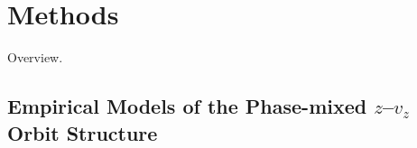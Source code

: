 


\section{Methods} \label{sec:methods}

Overview.

\subsection{Empirical Models of the Phase-mixed $z$--$v_z$ Orbit Structure}
\label{sec:zvz-structure}

